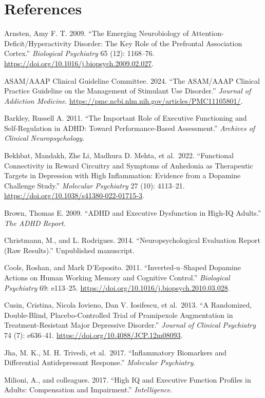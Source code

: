 \section{References}\label{10b_traad-references}

Arnsten, Amy F. T. 2009. ``The Emerging Neurobiology of Attention-Deficit/Hyperactivity Disorder: The Key Role of the Prefrontal Association Cortex.'' \emph{Biological Psychiatry} 65 (12): 1168--76. \url{https://doi.org/10.1016/j.biopsych.2009.02.027}.

ASAM/AAAP Clinical Guideline Committee. 2024. ``The ASAM/AAAP Clinical Practice Guideline on the Management of Stimulant Use Disorder.'' \emph{Journal of Addiction Medicine}. \url{https://pmc.ncbi.nlm.nih.gov/articles/PMC11105801/}.

Barkley, Russell A. 2011. ``The Important Role of Executive Functioning and Self-Regulation in ADHD: Toward Performance-Based Assessment.'' \emph{Archives of Clinical Neuropsychology}.

Bekhbat, Mandakh, Zhe Li, Madhura D. Mehta, et al.~2022. ``Functional Connectivity in Reward Circuitry and Symptoms of Anhedonia as Therapeutic Targets in Depression with High Inflammation: Evidence from a Dopamine Challenge Study.'' \emph{Molecular Psychiatry} 27 (10): 4113--21. \url{https://doi.org/10.1038/s41380-022-01715-3}.

Brown, Thomas E. 2009. ``ADHD and Executive Dysfunction in High-IQ Adults.'' \emph{The ADHD Report}.

Christmann, M., and L. Rodrigues. 2014. ``Neuropsychological Evaluation Report (Raw Results).'' Unpublished manuscript.

Cools, Roshan, and Mark D'Esposito. 2011. ``Inverted-u--Shaped Dopamine Actions on Human Working Memory and Cognitive Control.'' \emph{Biological Psychiatry} 69: e113--25. \url{https://doi.org/10.1016/j.biopsych.2010.03.028}.

Cusin, Cristina, Nicola Iovieno, Dan V. Iosifescu, et al.~2013. ``A Randomized, Double-Blind, Placebo-Controlled Trial of Pramipexole Augmentation in Treatment-Resistant Major Depressive Disorder.'' \emph{Journal of Clinical Psychiatry} 74 (7): e636--41. \url{https://doi.org/10.4088/JCP.12m08093}.

Jha, M. K., M. H. Trivedi, et al.~2017. ``Inflammatory Biomarkers and Differential Antidepressant Response.'' \emph{Molecular Psychiatry}.

Milioni, A., and colleagues. 2017. ``High IQ and Executive Function Profiles in Adults: Compensation and Impairment.'' \emph{Intelligence}.

